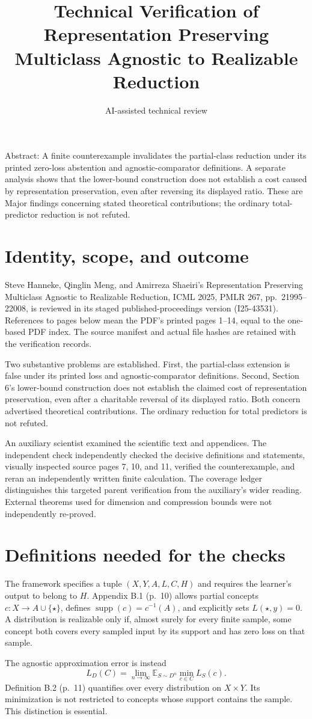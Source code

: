 \documentclass[10pt]{article}
\title{Technical Verification of Representation Preserving Multiclass Agnostic to Realizable Reduction}
\author{AI-assisted technical review}
\date{}
\begin{document}
\maketitle
Abstract: A finite counterexample invalidates the partial-class reduction under its printed zero-loss abstention and agnostic-comparator definitions. A separate analysis shows that the lower-bound construction does not establish a cost caused by representation preservation, even after reversing its displayed ratio. These are Major findings concerning stated theoretical contributions; the ordinary total-predictor reduction is not refuted.\par
\section*{Identity, scope, and outcome}
Steve Hanneke, Qinglin Meng, and Amirreza Shaeiri’s Representation Preserving Multiclass Agnostic to Realizable Reduction, ICML 2025, PMLR 267, pp. 21995–22008, is reviewed in its staged published-proceedings version (I25-43531). References to pages below mean the PDF’s printed pages 1–14, equal to the one-based PDF index. The source manifest and actual file hashes are retained with the verification records.\par
Two substantive problems are established. First, the partial-class extension is false under its printed loss and agnostic-comparator definitions. Second, Section 6’s lower-bound construction does not establish the claimed cost of representation preservation, even after a charitable reversal of its displayed ratio. Both concern advertised theoretical contributions. The ordinary reduction for total predictors is not refuted.\par
An auxiliary scientist examined the scientific text and appendices. The independent check independently checked the decisive definitions and statements, visually inspected source pages 7, 10, and 11, verified the counterexample, and reran an independently written finite calculation. The coverage ledger distinguishes this targeted parent verification from the auxiliary’s wider reading. External theorems used for dimension and compression bounds were not independently re-proved.\par
\section*{Definitions needed for the checks}
The framework specifies a tuple \((X,Y,A,L,C,H)\) and requires the learner’s output to belong to \(H\). Appendix B.1 (p. 10) allows partial concepts \(c:X\to A\cup\{\star\}\), defines \(\operatorname{supp}(c)=c^{-1}(A)\), and explicitly sets \(L(\star,y)=0\). A distribution is realizable only if, almost surely for every finite sample, some concept both covers every sampled input by its support and has zero loss on that sample.\par
The agnostic approximation error is instead \[L_D(C)=\lim_{n\to\infty}\mathbb E_{S\sim D^n}\min_{c\in C}L_S(c).\] Definition B.2 (p. 11) quantifies over every distribution on \(X\times Y\). Its minimization is not restricted to concepts whose support contains the sample. This distinction is essential.\par
\end{document}
